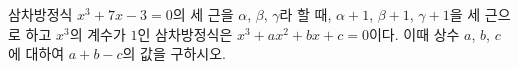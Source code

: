 삼차방정식 $x^3+7x-3=0$의 세 근을 $\alpha$, $\beta$, $\gamma$라 할 때, $\alpha+1$, $\beta+1$, $\gamma+1$을 세 근으로 하고 $x^3$의 계수가 $1$인 삼차방정식은 $x^3+ax^2+bx+c=0$이다. 이때 상수 $a$, $b$, $c$에 대하여 $a+b-c$의 값을 구하시오.
